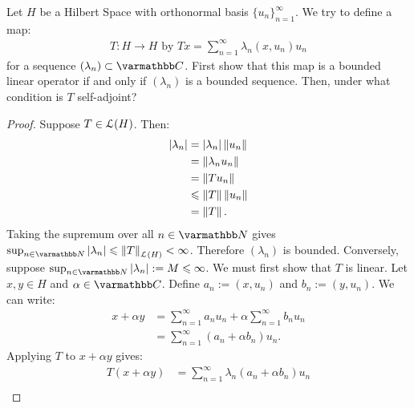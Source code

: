 \documentclass[10pt,oneside,openany]{memoir}
\begin{document}
\begin{exercise}
Let $H$ be a Hilbert Space with orthonormal basis $\{u_n\}_{n = 1}^\infty$. We try to define a map:
    \begin{equation*}
    \begin{split}
        T:H \rightarrow H \text{ by }Tx = \sum_{n = 1}^\infty \lambda_n (x,u_n)u_n
    \end{split}
    \end{equation*}
for a sequence $(\lambda_n) \subset \bfC$. First show that this map is a bounded linear operator if and only if $(\lambda_n)$ is a bounded sequence. Then, under what condition is $T$ self-adjoint?
\end{exercise}
\begin{proof}
    Suppose $T \in \mathcal{L}(H)$. Then:
        \begin{equation*}
        \begin{split}
            |\lambda_n| 
            & = |\lambda_n| \left\lVert u_n \right\rVert \\
            & = \left\lVert \lambda_n u_n \right\rVert \\
            & = \left\lVert T u_n \right\rVert \\
            & \leqslant \left\lVert T \right\rVert \left\lVert u_n \right\rVert \\
            & = \left\lVert T \right\rVert.
        \end{split}
        \end{equation*}
    Taking the supremum over all $n \in \bfN$ gives $\sup_{n \in \bfN}|\lambda_n| \leq \lnorm T \rnorm_{\cL(H)} < \infty$. Therefore $(\lambda_n)$ is bounded. Conversely, suppose $\sup_{n \in \bfN}|\lambda_n| := M \leq \infty$. We must first show that $T$ is linear. Let $x,y \in H$ and $\alpha \in \bfC$. Define $a_n := (x,u_n)$ and $b_n := (y,u_n)$. We can write:
        \begin{equation*}
        \begin{split}
            x + \alpha y 
            & = \sum_{n = 1}^\infty a_n u_n + \alpha \sum_{n = 1}^\infty b_n u_n \\
            & = \sum_{n = 1}^\infty (a_n + \alpha b_n)u_n.
        \end{split}
        \end{equation*}
    Applying $T$ to $x+\alpha y$ gives:
        \begin{equation*}
        \begin{split}
            T(x+\alpha y) 
            & = \sum_{n = 1}^\infty \lambda_n (a_n + \alpha b_n)u_n \\

\end{split}
\end{equation*}
\end{proof}
\end{document}
